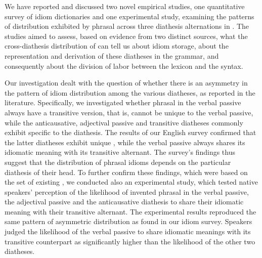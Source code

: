 \documentclass[output=paper]{langsci/langscibook}
\begin{document}
We have reported and discussed two novel empirical studies, one quantitative
survey of idiom dictionaries and one experimental study, examining the patterns
of distribution exhibited by phrasal  across three diathesis alternations
in . The studies aimed to assess, based on evidence from two distinct
sources, what the cross-diathesis distribution of  can tell us about
idiom storage, about the representation and derivation of these diatheses in
the grammar, and consequently about the division of labor between the lexicon
and the syntax.

Our investigation dealt with the question of whether there is an asymmetry in
the pattern of idiom distribution among the various diatheses, as reported in
the literature. Specifically, we investigated whether phrasal  in the
verbal passive always have a transitive version, that is, cannot be unique to
the verbal passive, while the anticausative, adjectival passive and transitive
diatheses commonly exhibit  specific to the diathesis. The results of our
English survey confirmed that the latter diatheses exhibit unique , while
the verbal passive always shares its idiomatic meaning with its transitive
alternant. The survey’s findings thus suggest that the distribution of phrasal
idioms depends on the particular diathesis of their head. To further confirm
these findings, which were based on the set of existing , we conducted
also an experimental study, which tested native speakers’ perception of the
likelihood of invented phrasal  in the verbal passive, the adjectival
passive and the anticausative diathesis to share their idiomatic meaning with
their transitive alternant. The experimental results reproduced the same
pattern of asymmetric distribution as found in our idiom survey. Speakers
judged the likelihood of the verbal passive to share idiomatic meanings with
its transitive counterpart as significantly higher than the likelihood of the
other two diatheses.
\end{document}

